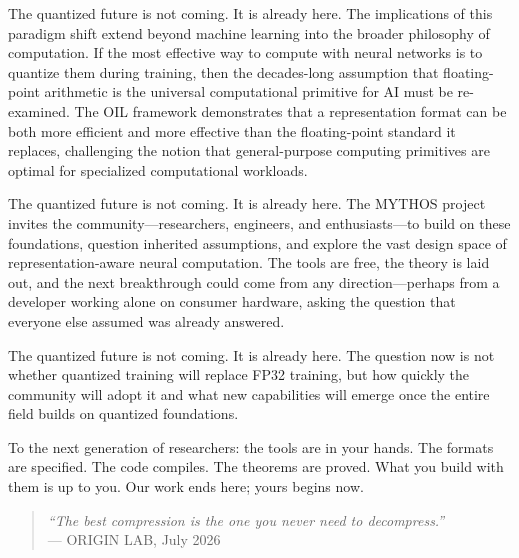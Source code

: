 The quantized future is not coming. It is already here. The implications of this paradigm shift extend beyond machine learning into the broader philosophy of computation. If the most effective way to compute with neural networks is to quantize them during training, then the decades-long assumption that floating-point arithmetic is the universal computational primitive for AI must be re-examined. The OIL framework demonstrates that a representation format can be both more efficient and more effective than the floating-point standard it replaces, challenging the notion that general-purpose computing primitives are optimal for specialized computational workloads.

The quantized future is not coming. It is already here. The MYTHOS project invites the community---researchers, engineers, and enthusiasts---to build on these foundations, question inherited assumptions, and explore the vast design space of representation-aware neural computation. The tools are free, the theory is laid out, and the next breakthrough could come from any direction---perhaps from a developer working alone on consumer hardware, asking the question that everyone else assumed was already answered.

The quantized future is not coming. It is already here. The question now is not whether quantized training will replace FP32 training, but how quickly the community will adopt it and what new capabilities will emerge once the entire field builds on quantized foundations.

To the next generation of researchers: the tools are in your hands. The formats are specified. The code compiles. The theorems are proved. What you build with them is up to you. Our work ends here; yours begins now.


\begin{quote}
\textit{``The best compression is the one you never need to decompress.''}\\
--- ORIGIN LAB, July 2026
\end{quote}